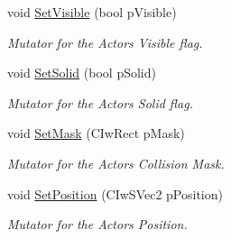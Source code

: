 \begin{DoxyCompactItemize}
void \hyperlink{class_i_ty_actor_af1f3341d3cb568b2420cfce2a570e507}{SetVisible} (bool pVisible)
\begin{DoxyCompactList}\small\item\em Mutator for the Actors Visible flag. \end{DoxyCompactList}\item 
void \hyperlink{class_i_ty_actor_acc5fe8fe823f7a8f95a6bbe505ebe95a}{SetSolid} (bool pSolid)
\begin{DoxyCompactList}\small\item\em Mutator for the Actors Solid flag. \end{DoxyCompactList}\item 
void \hyperlink{class_i_ty_actor_aa119f79b398074a9b9d6281e7b463fee}{SetMask} (CIwRect pMask)
\begin{DoxyCompactList}\small\item\em Mutator for the Actors Collision Mask. \end{DoxyCompactList}\item 
void \hyperlink{class_i_ty_actor_a9b37537093a7b6c412d6f1379b4eabb9}{SetPosition} (CIwSVec2 pPosition)
\begin{DoxyCompactList}\small\item\em Mutator for the Actors Position. \end{DoxyCompactList}\end{DoxyCompactItemize}
